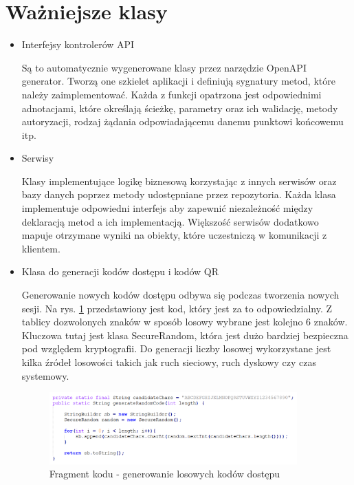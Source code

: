 \section{Ważniejsze klasy}
\begin{itemize}
\item Interfejsy kontrolerów API

Są to automatycznie wygenerowane klasy przez narzędzie OpenAPI generator. Tworzą one szkielet aplikacji i definiują sygnatury metod, które należy zaimplementować. Każda z funkcji opatrzona jest odpowiednimi adnotacjami, które określają ścieżkę, parametry oraz ich walidację, metody autoryzacji, rodzaj żądania odpowiadającemu danemu punktowi końcowemu itp.

\item Serwisy

Klasy implementujące logikę biznesową korzystając z innych serwisów oraz bazy danych poprzez metody udostępniane przez repozytoria. Każda klasa implementuje odpowiedni interfejs aby zapewnić niezależność między deklaracją metod a ich implementacją. Większość serwisów dodatkowo mapuje otrzymane wyniki na obiekty, które uczestniczą w komunikacji z klientem.

\item Klasa do generacji kodów dostępu i kodów QR

Generowanie nowych kodów dostępu odbywa się podczas tworzenia nowych sesji. Na rys. \ref{fig:code-generation} przedstawiony jest kod, który jest za to odpowiedzialny. Z tablicy dozwolonych znaków w sposób losowy wybrane jest kolejno 6 znaków. Kluczowa tutaj jest klasa SecureRandom, która jest dużo bardziej bezpieczna pod względem kryptografii. Do generacji liczby losowej wykorzystane jest kilka źródeł losowości takich jak ruch sieciowy, ruch dyskowy czy czas systemowy. 

\begin{figure}[h]
\centering
\includegraphics[width=0.9\textwidth]{./graf/code_generation.PNG}
\caption{Fragment kodu - generowanie losowych kodów dostępu}
\label{fig:code-generation}
\end{figure}

\end{itemize}
